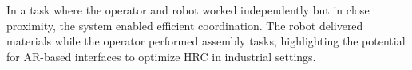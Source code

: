 In a task where the operator and robot worked independently but in close proximity, the system enabled efficient coordination. The robot delivered materials while the operator performed assembly tasks, highlighting the potential for \ac{AR}-based interfaces to optimize \ac{HRC} in industrial settings.








